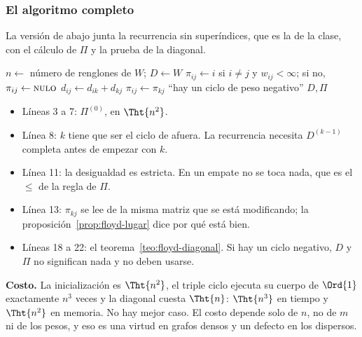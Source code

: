 \documentclass[11pt,letterpaper]{article}
\begin{document}
\subsubsection*{El algoritmo completo}

La versión de abajo junta la recurrencia sin superíndices, que es la
de la clase, con el cálculo de $\Pi$ y la prueba de la diagonal.

\begin{algorithm}[H]
\caption{\textsc{Floyd-Warshall}$(W)$, con $\Pi$ y en el lugar}
\label{alg:floyd-warshall}
\begin{algorithmic}[1]
  \State $n \gets$ número de renglones de $W$; \quad $D \gets W$
      \State $\pi_{ij} \gets i$ si $i \neq j$ y $w_{ij} < \infty$; si
             no, $\pi_{ij} \gets \textsc{nulo}$
    \EndFor
  \EndFor
   
          \State $d_{ij} \gets d_{ik} + d_{kj}$
          \State $\pi_{ij} \gets \pi_{kj}$
        \EndIf
      \EndFor
    \EndFor
  \EndFor
      \State \Return ``hay un ciclo de peso negativo''
    \EndIf
  \EndFor
  \State \Return $D, \Pi$
\EndProcedure
\end{algorithmic}
\end{algorithm}

\begin{itemize}[itemsep=0.1em]
  \item Líneas 3 a 7: $\Pi^{(0)}$, en $\Tht{n^2}$.
  \item Línea 8: $k$ tiene que ser el ciclo de afuera. La recurrencia
        necesita $D^{(k-1)}$ completa antes de empezar con $k$.
  \item Línea 11: la desigualdad es estricta. En un empate no se toca
        nada, que es el $\le$ de la regla de $\Pi$.
  \item Línea 13: $\pi_{kj}$ se lee de la misma matriz que se está
        modificando; la proposición~\ref{prop:floyd-lugar} dice por qué
        está bien.
  \item Líneas 18 a 22: el teorema~\ref{teo:floyd-diagonal}. Si hay un
        ciclo negativo, $D$ y $\Pi$ no significan nada y no deben
        usarse.
\end{itemize}

\textbf{Costo.} La inicialización es $\Tht{n^2}$, el triple ciclo
ejecuta su cuerpo de $\Ord{1}$ exactamente $n^3$ veces y la diagonal
cuesta $\Tht{n}$: $\Tht{n^3}$ en tiempo y $\Tht{n^2}$ en memoria. No
hay mejor caso. El costo depende solo de $n$, no de $m$ ni de los
pesos, y eso es una virtud en grafos densos y un defecto en los
dispersos.
\end{document}
